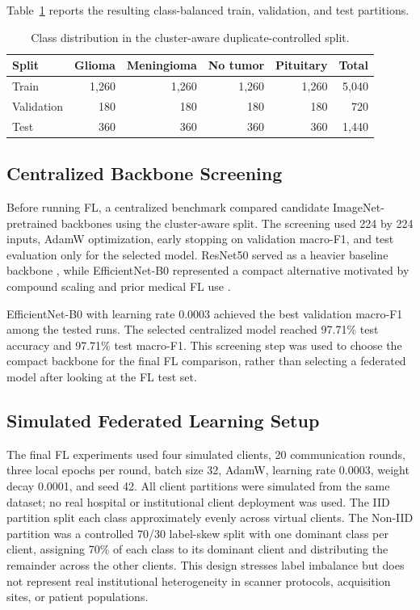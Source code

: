 \documentclass[10pt,twocolumn]{article}
\begin{document}
Table~\ref{tab:split-counts} reports the resulting class-balanced train, validation, and test partitions.

\begin{table}[t]
\centering
\caption{Class distribution in the cluster-aware duplicate-controlled split.}
\label{tab:split-counts}
\scriptsize
\setlength{\tabcolsep}{2pt}
\begin{tabular*}{\columnwidth}{@{\extracolsep{\fill}}lrrrrr@{}}
\toprule
Split & Glioma & Meningioma & No tumor & Pituitary & Total \\
\midrule
Train & 1,260 & 1,260 & 1,260 & 1,260 & 5,040 \\
Validation & 180 & 180 & 180 & 180 & 720 \\
Test & 360 & 360 & 360 & 360 & 1,440 \\
\bottomrule
\end{tabular*}
\end{table}

\subsection{Centralized Backbone Screening}
Before running FL, a centralized benchmark compared candidate ImageNet-pretrained backbones using the cluster-aware split. The screening used 224 by 224 inputs, AdamW optimization, early stopping on validation macro-F1, and test evaluation only for the selected model. ResNet50 served as a heavier baseline backbone \cite{he2016resnet}, while EfficientNet-B0 represented a compact alternative motivated by compound scaling and prior medical FL use \cite{tan2019efficientnet,abubakr2026explainable}.

EfficientNet-B0 with learning rate 0.0003 achieved the best validation macro-F1 among the tested runs. The selected centralized model reached 97.71\% test accuracy and 97.71\% test macro-F1. This screening step was used to choose the compact backbone for the final FL comparison, rather than selecting a federated model after looking at the FL test set.

\subsection{Simulated Federated Learning Setup}
The final FL experiments used four simulated clients, 20 communication rounds, three local epochs per round, batch size 32, AdamW, learning rate 0.0003, weight decay 0.0001, and seed 42. All client partitions were simulated from the same dataset; no real hospital or institutional client deployment was used. The IID partition split each class approximately evenly across virtual clients. The Non-IID partition was a controlled 70/30 label-skew split with one dominant class per client, assigning 70\% of each class to its dominant client and distributing the remainder across the other clients. This design stresses label imbalance but does not represent real institutional heterogeneity in scanner protocols, acquisition sites, or patient populations.
\end{document}
